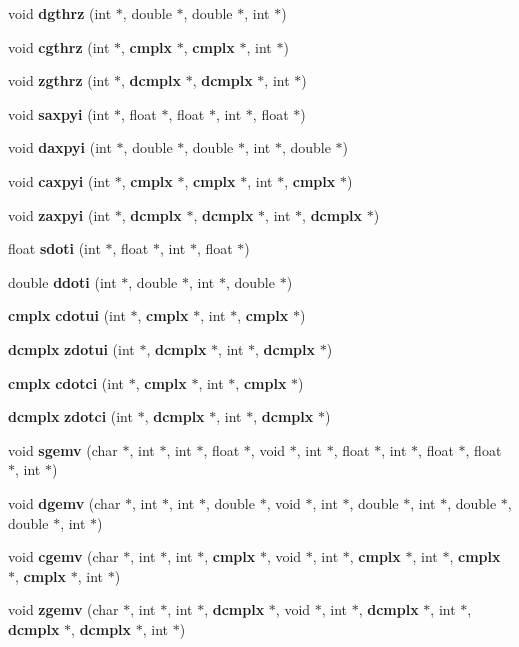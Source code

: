 \begin{CompactItemize}
void {\bf dgthrz} (int $\ast$, double $\ast$, double $\ast$, int $\ast$)
\item 
void {\bf cgthrz} (int $\ast$, {\bf cmplx} $\ast$, {\bf cmplx} $\ast$, int $\ast$)
\item 
void {\bf zgthrz} (int $\ast$, {\bf dcmplx} $\ast$, {\bf dcmplx} $\ast$, int $\ast$)
\item 
void {\bf saxpyi} (int $\ast$, float $\ast$, float $\ast$, int $\ast$, float $\ast$)
\item 
void {\bf daxpyi} (int $\ast$, double $\ast$, double $\ast$, int $\ast$, double $\ast$)
\item 
void {\bf caxpyi} (int $\ast$, {\bf cmplx} $\ast$, {\bf cmplx} $\ast$, int $\ast$, {\bf cmplx} $\ast$)
\item 
void {\bf zaxpyi} (int $\ast$, {\bf dcmplx} $\ast$, {\bf dcmplx} $\ast$, int $\ast$, {\bf dcmplx} $\ast$)
\item 
float {\bf sdoti} (int $\ast$, float $\ast$, int $\ast$, float $\ast$)
\item 
double {\bf ddoti} (int $\ast$, double $\ast$, int $\ast$, double $\ast$)
\item 
{\bf cmplx} {\bf cdotui} (int $\ast$, {\bf cmplx} $\ast$, int $\ast$, {\bf cmplx} $\ast$)
\item 
{\bf dcmplx} {\bf zdotui} (int $\ast$, {\bf dcmplx} $\ast$, int $\ast$, {\bf dcmplx} $\ast$)
\item 
{\bf cmplx} {\bf cdotci} (int $\ast$, {\bf cmplx} $\ast$, int $\ast$, {\bf cmplx} $\ast$)
\item 
{\bf dcmplx} {\bf zdotci} (int $\ast$, {\bf dcmplx} $\ast$, int $\ast$, {\bf dcmplx} $\ast$)
\item 
void {\bf sgemv} (char $\ast$, int $\ast$, int $\ast$, float $\ast$, void $\ast$, int $\ast$, float $\ast$, int $\ast$, float $\ast$, float $\ast$, int $\ast$)
\item 
void {\bf dgemv} (char $\ast$, int $\ast$, int $\ast$, double $\ast$, void $\ast$, int $\ast$, double $\ast$, int $\ast$, double $\ast$, double $\ast$, int $\ast$)
\item 
void {\bf cgemv} (char $\ast$, int $\ast$, int $\ast$, {\bf cmplx} $\ast$, void $\ast$, int $\ast$, {\bf cmplx} $\ast$, int $\ast$, {\bf cmplx} $\ast$, {\bf cmplx} $\ast$, int $\ast$)
\item 
void {\bf zgemv} (char $\ast$, int $\ast$, int $\ast$, {\bf dcmplx} $\ast$, void $\ast$, int $\ast$, {\bf dcmplx} $\ast$, int $\ast$, {\bf dcmplx} $\ast$, {\bf dcmplx} $\ast$, int $\ast$)
\item 

\end{CompactItemize}
